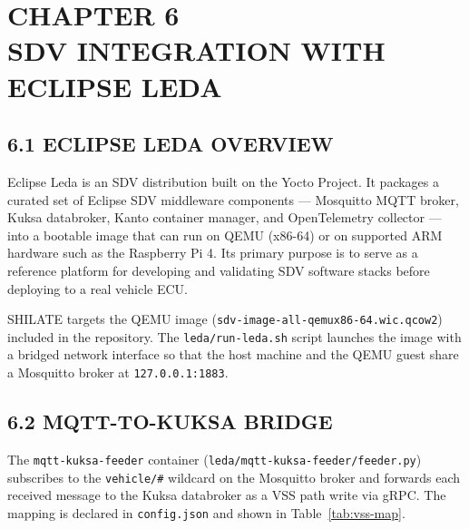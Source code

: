 \documentclass[12pt,a4paper]{article}
\begin{document}
\section*{\centering CHAPTER 6\\[0.3cm] SDV INTEGRATION WITH ECLIPSE LEDA}
\vspace{2\baselineskip}

\subsection*{6.1 \quad ECLIPSE LEDA OVERVIEW}

\indent Eclipse Leda \cite{EclipseLeda2023} is an SDV distribution built on the
Yocto Project. It packages a curated set of Eclipse SDV middleware components
--- Mosquitto MQTT broker, Kuksa databroker, Kanto container manager, and
OpenTelemetry collector --- into a bootable image that can run on QEMU
(x86-64) or on supported ARM hardware such as the Raspberry Pi 4. Its primary
purpose is to serve as a reference platform for developing and validating SDV
software stacks before deploying to a real vehicle ECU.

SHILATE targets the QEMU image (\texttt{sdv-image-all-qemux86-64.wic.qcow2})
included in the repository. The \texttt{leda/run-leda.sh} script launches the
image with a bridged network interface so that the host machine and the QEMU
guest share a Mosquitto broker at \texttt{127.0.0.1:1883}.

\subsection*{6.2 \quad MQTT-TO-KUKSA BRIDGE}

\indent The \texttt{mqtt-kuksa-feeder} container (\texttt{leda/mqtt-kuksa-feeder/feeder.py})
subscribes to the \texttt{vehicle/\#} wildcard on the Mosquitto broker and
forwards each received message to the Kuksa databroker as a VSS path write via
gRPC. The mapping is declared in \texttt{config.json} and shown in
Table~\ref{tab:vss-map}.
\end{document}
